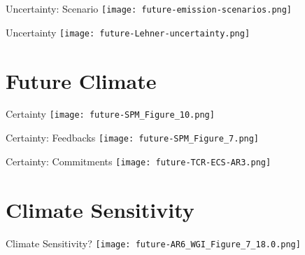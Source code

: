 \documentclass[aspectratio=169]{beamer}
\begin{document}
\begin{frame}{Uncertainty: Scenario}
    \centering
    \texttt{[image: future-emission-scenarios.png]}
\end{frame}

\begin{frame}{Uncertainty}
    \centering
    \texttt{[image: future-Lehner-uncertainty.png]}


\end{frame}

\section{Future Climate}

\begin{frame}{Certainty}
    \centering
    \texttt{[image: future-SPM\_Figure\_10.png]}
\end{frame}

\begin{frame}{Certainty: Feedbacks}
    \centering
    \texttt{[image: future-SPM\_Figure\_7.png]}
\end{frame}

\begin{frame}{Certainty: Commitments}
    \centering
    \texttt{[image: future-TCR-ECS-AR3.png]}
\end{frame}

\section{Climate Sensitivity}

\begin{frame}{Climate Sensitivity?}
    \centering
    \texttt{[image: future-AR6\_WGI\_Figure\_7\_18.0.png]}
\end{frame}
\end{document}
